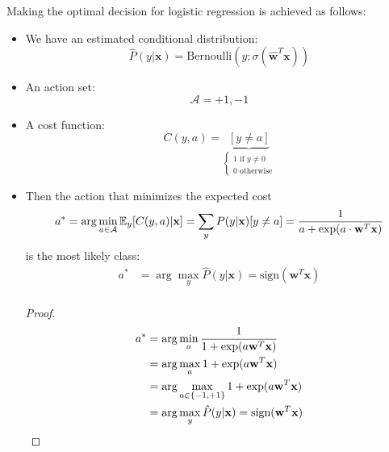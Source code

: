 \documentclass[a4paper,10pt,twoside]{article}
\begin{document}
Making the optimal decision for logistic regression is achieved as follows:
\begin{itemize}
\item We have an estimated conditional distribution:
  \begin{equation*}
    \hat{P}(y|\mathbf{x})=\mathrm{Bernoulli}(y;\sigma(\hat{\mathbf{w}}^T\mathbf{x}))
  \end{equation*}
\item An action set:
  \begin{equation*}
    \mathcal{A} = {+1,-1}
  \end{equation*}
\item A cost function:
  \begin{equation*}
    C(y,a)=\underbrace{[y\neq a]}_{
      \begin{cases}
        1\text{ if }y\neq0\\
        0\text{ otherwise}
      \end{cases}
    }
  \end{equation*}
\item Then the action that minimizes the expected cost
  \begin{equation*}
    a^*=\arg\min_{a\in\mathcal{A}}\mathbb{E}_y[C(y,a)|\mathbf{x}] = \sum_yP(y|\mathbf{x})[y\neq a] = {1\over a+\exp(a\cdot \mathbf{w}^T\mathbf{x})}
  \end{equation*}
  is the most likely class:
  \begin{align*}
    a^*&=\arg\max_y\hat{P}(y|\mathbf{x})=\text{sign}(\mathbf{w}^T\mathbf{x})\\
  \end{align*}
  \begin{proof}
    \begin{align*}
      a^* &=\arg\min_a{1\over 1+\exp(a\mathbf{w}^T\mathbf{x})}\\
          &=\arg\max_a 1+\exp(a\mathbf{w}^T\mathbf{x})\\
          &=\arg\max_{a\in\{-1,+1\}} 1+\exp(a\mathbf{w}^T\mathbf{x})\\
          &=\arg\max_y\hat{P}(y|\mathbf{x})=\text{sign}(\mathbf{w}^T\mathbf{x})\\
    \end{align*}
  \end{proof}
\end{itemize}
\end{document}
